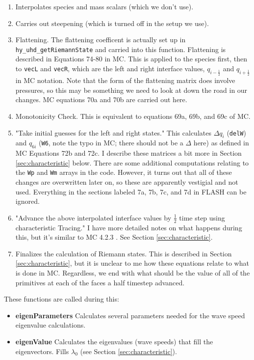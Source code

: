 \documentclass[preprint,11pt]{aastex}
\begin{document}
\begin{description}
\begin{description}
\begin{itemize}
\begin{itemize}
\begin{enumerate}
					\item Interpolates species and mass scalars (which we don't use).
					\item Carries out steepening (which is turned off in the setup we use).
					\item Flattening.  The flattening coefficent is actually set up in \verb!hy_uhd_getRiemannState! and carried into this function.  Flattening is described in Equations 74-80 in MC.  This is applied to the species first, then to \verb!vecL! and \verb!vecR!, which are the left and right interface values, $q_{i-\frac{1}{2}}$ and $q_{i+\frac{1}{2}}$ in MC notation.  Note that the form of the flattening matrix does involve pressures, so this may be something we need to look at down the road in our changes.  MC equations 70a and 70b are carried out here.
					\item Monotonicity Check.  This is equivalent to equations 69a, 69b, and 69c of MC.
					\item "Take initial guesses for the left and right states."  This calculates $\Delta q_i$ (\verb!delW!) and $q_{6i}$ (\verb!W6!, note the typo in MC; there should not be a $\Delta$ here) as defined in MC Equations 72b and 72c.  I describe these matrices a bit more in Section \ref{sec:characteristic} below.  There are some additional computations relating to the \verb!Wp! and \verb!Wm! arrays in the code.  However, it turns out that all of these changes are overwritten later on, so these are apparently vestigial and not used.  Everything in the sections labeled 7a, 7b, 7c, and 7d in FLASH can be ignored.
					\item "Advance the above interpolated interface values by $\frac{1}{2}$ time step using characteristic Tracing."  I have more detailed notes on what happens during this, but it's similar to MC 4.2.3 .  See Section \ref{sec:characteristic}.
					\item Finalizes the calculation of Riemann states.  This is described in Section \ref{sec:characteristic}, but it is unclear to me how these equations relate to what is done in MC.  Regardless, we end with what should be the value of all of the primitives at each of the faces a half timestep advanced.
				\end{enumerate}
				These functions are called during this:
				\begin{itemize}
					\item \textbf{eigenParameters} Calculates several parameters needed for the wave speed eigenvalue calculations.
					\item \textbf{eigenValue} Calculates the eigenvalues (wave speeds) that fill the eigenvectors.  Fills $\lambda_0$ (see Section \ref{sec:characteristic}).

\end{itemize}
\end{itemize}
\end{itemize}
\end{description}
\end{description}
\end{document}
